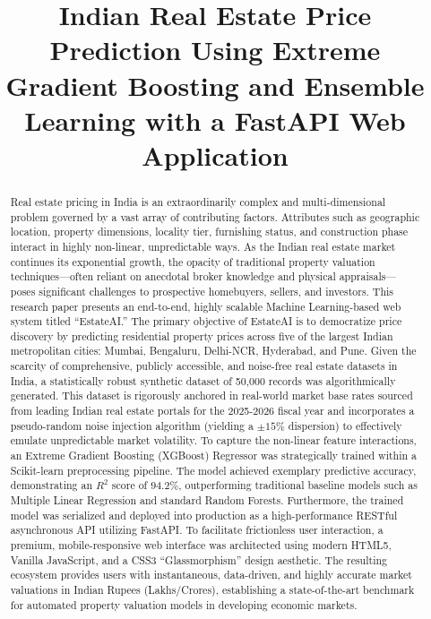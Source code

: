 \documentclass[conference]{IEEEtran}
\begin{document}
\title{Indian Real Estate Price Prediction Using Extreme Gradient Boosting and Ensemble Learning with a FastAPI Web Application\\
}

\author{
}

\maketitle

\begin{abstract}
Real estate pricing in India is an extraordinarily complex and multi-dimensional problem governed by a vast array of contributing factors. Attributes such as geographic location, property dimensions, locality tier, furnishing status, and construction phase interact in highly non-linear, unpredictable ways. As the Indian real estate market continues its exponential growth, the opacity of traditional property valuation techniques—often reliant on anecdotal broker knowledge and physical appraisals—poses significant challenges to prospective homebuyers, sellers, and investors. This research paper presents an end-to-end, highly scalable Machine Learning-based web system titled ``EstateAI.'' The primary objective of EstateAI is to democratize price discovery by predicting residential property prices across five of the largest Indian metropolitan cities: Mumbai, Bengaluru, Delhi-NCR, Hyderabad, and Pune. Given the scarcity of comprehensive, publicly accessible, and noise-free real estate datasets in India, a statistically robust synthetic dataset of 50,000 records was algorithmically generated. This dataset is rigorously anchored in real-world market base rates sourced from leading Indian real estate portals for the 2025-2026 fiscal year and incorporates a pseudo-random noise injection algorithm (yielding a $\pm 15\%$ dispersion) to effectively emulate unpredictable market volatility. To capture the non-linear feature interactions, an Extreme Gradient Boosting (XGBoost) Regressor was strategically trained within a Scikit-learn preprocessing pipeline. The model achieved exemplary predictive accuracy, demonstrating an $R^2$ score of $94.2\%$, outperforming traditional baseline models such as Multiple Linear Regression and standard Random Forests. Furthermore, the trained model was serialized and deployed into production as a high-performance RESTful asynchronous API utilizing FastAPI. To facilitate frictionless user interaction, a premium, mobile-responsive web interface was architected using modern HTML5, Vanilla JavaScript, and a CSS3 ``Glassmorphism'' design aesthetic. The resulting ecosystem provides users with instantaneous, data-driven, and highly accurate market valuations in Indian Rupees (Lakhs/Crores), establishing a state-of-the-art benchmark for automated property valuation models in developing economic markets.
\end{abstract}
\end{document}
